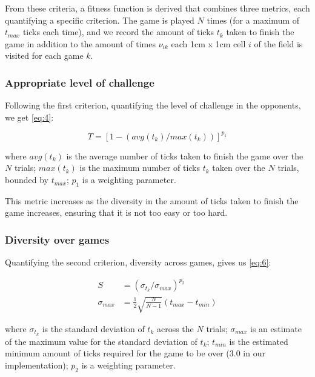From these criteria, a fitness function is derived
\citep[Chap.~2.2.2]{yannakakis2005ai} that combines three metrics, each
quantifying a specific criterion. The game is played \(N\) times (for a maximum
of \(t_{max}\) ticks each time), and we record the amount of ticks \(t_k\) taken
to finish the game in addition to the amount of times \(\nu_{ik}\) each 1cm x
1cm cell \(i\) of the field is visited for each game \(k\).

\subsubsection{Appropriate level of challenge}
\label{sec:appr-level-chall}

Following the first criterion, quantifying the level of challenge in the
opponents, we get \eqref{eq:4}:

\begin{equation}
  \label{eq:4}
  T = [ 1- (avg(t_k)/max(t_k))]^{p_1}
\end{equation}

where \(avg(t_k)\) is the average number of ticks taken to finish the game over
the \(N\) trials; \(max(t_k)\) is the maximum number of ticks \(t_k\) taken over
the \(N\) trials, bounded by \(t_{max}\); \(p_1\) is a weighting parameter.

This metric increases as the diversity in the amount of ticks taken to finish
the game increases, ensuring that it is not too easy or too hard.

\subsubsection{Diversity over games}
\label{sec:diversity-over-games}

Quantifying the second criterion, diversity across games, gives us \eqref{eq:6}:

\begin{subequations}
  \begin{align}
    \label{eq:6}
    S &= (\sigma_{t_k} / \sigma_{max})^{p_2}\\
    \sigma_{max} &= \frac{1}{2} \sqrt{\frac{N}{N-1}} (t_{max} - t_{min})
  \end{align}
\end{subequations}

where \(\sigma_{t_k}\) is the standard deviation of \(t_k\) across the \(N\)
trials; \(\sigma_{max}\) is an estimate of the maximum value for the standard
deviation of \(t_k\); \(t_{min}\) is the estimated minimum amount of ticks
required for the game to be over (3.0 in our implementation); \(p_2\) is a
weighting parameter.


